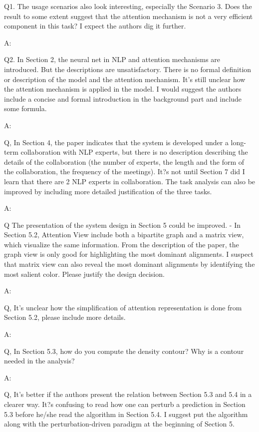 Q1. The usage scenarios also look interesting, especially the Scenario 3. Does the result to some extent suggest that the attention mechanism is not a very efficient component in this task? I expect the authors dig it further.

A:

Q2. In Section 2, the neural net in NLP and attention mechanisms are introduced. But the descriptions are unsatisfactory. There is no formal definition or description of the model and the attention mechanism. It's still unclear how the attention mechanism is applied in the model. I would suggest the authors include a concise and formal introduction in the background part and include some formula.

A:

Q, In Section 4, the paper indicates that the system is developed under a long-term collaboration with NLP experts, but there is no description describing the details of the collaboration (the number of experts, the length and the form of the collaboration, the frequency of the meetings). It?s not until Section 7 did I learn that there are 2 NLP experts in collaboration. The task analysis can also be improved by including more detailed justification of the three tasks.

A:

Q The presentation of the system design in Section 5 could be improved.
- In Section 5.2, Attention View include both a bipartite graph and a matrix view, which visualize the same information. From the description of the paper, the graph view is only good for highlighting the most dominant alignments. I suspect that matrix view can also reveal the most dominant alignments by identifying the most salient color. Please justify the design decision.

A:

Q, It's unclear how the simplification of attention representation is done from Section 5.2, please include more details.

A:

Q, In Section 5.3, how do you compute the density contour? Why is a contour needed in the analysis?

A:

Q, It's better if the authors present the relation between Section 5.3 and 5.4 in a clearer way. It?s confusing to read how one can perturb a prediction in Section 5.3 before he/she read the algorithm in Section 5.4. I suggest put the algorithm along with the perturbation-driven paradigm at the beginning of Section 5.

